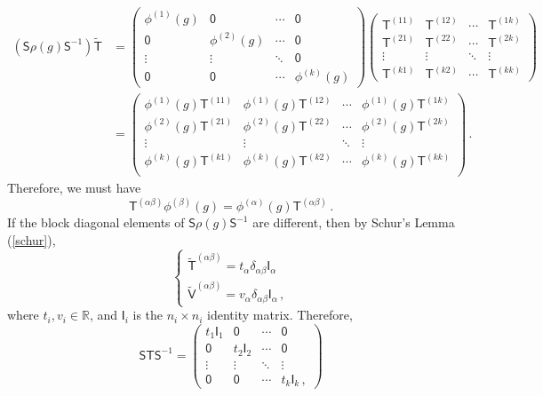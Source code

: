 \documentclass{article}
\theoremstyle{plain}\theoremheaderfont{\normalfont\itshape}\theorembodyfont{\rmfamily}\theoremseparator{.}\newtheorem*{rem}{Remark}\newtheorem*{ex}{Example}\newtheorem*{proof}{Proof}\newtheorem*{altp}{Alternative proof}
\theoremstyle{plain}\theoremheaderfont{\normalfont\bfseries}\theorembodyfont{\rmfamily}\theoremseparator{.}\newtheorem{thm}{Theorem}[section]\newtheorem{lem}[thm]{Lemma}\newtheorem{prop}[thm]{Proposition}\newtheorem*{cor}{Corollary}\newtheorem{defn}[thm]{Definition}\newtheorem{clm}[thm]{Claim}\newtheorem{clminproof}{Claim}
\theoremstyle{break}\theoremheaderfont{\normalfont\itshape}\theorembodyfont{\rmfamily}\theoremseparator{.\medskip}\newtheorem*{proofskip}{Proof}\newtheorem*{exs}{Examples}\newtheorem*{rems}{Remarks}
\theoremstyle{break}\theoremheaderfont{\normalfont\bfseries}\theorembodyfont{\rmfamily}\theoremseparator{.\medskip}\newtheorem{lemskip}[thm]{Lemma}\newtheorem{defnskip}[thm]{Definition}\newtheorem{propskip}[thm]{Proposition}\newtheorem{thmskip}[thm]{Theorem}
\numberwithin{equation}{section}
\begin{document}
	\begin{align*}
		(\mathsf{S}\rho(g)\mathsf{S}^{-1})\tilde{\mathsf{T}}&=\begin{pmatrix}
			\phi^{(1)}(g) & \mathsf{0} & \cdots & \mathsf{0}\\
			\mathsf{0} & \phi^{(2)}(g) & \cdots & \mathsf{0}\\
			\vdots & \vdots & \ddots & \mathsf{0}\\
			\mathsf{0} & \mathsf{0} & \cdots & \phi^{(k)}(g)
		\end{pmatrix}\begin{pmatrix}
			\mathsf{T}^{(11)} & \mathsf{T}^{(12)} & \cdots & \mathsf{T}^{(1k)}\\
			\mathsf{T}^{(21)} & \mathsf{T}^{(22)} & \cdots & \mathsf{T}^{(2k)}\\
			\vdots & \vdots & \ddots & \vdots\\
			\mathsf{T}^{(k1)} & \mathsf{T}^{(k2)} & \cdots & \mathsf{T}^{(kk)}
		\end{pmatrix}\\
		&=\begin{pmatrix}
			\phi^{(1)}(g)\mathsf{T}^{(11)} & \phi^{(1)}(g)\mathsf{T}^{(12)} & \cdots & \phi^{(1)}(g)\mathsf{T}^{(1k)}\\
			\phi^{(2)}(g)\mathsf{T}^{(21)} & \phi^{(2)}(g)\mathsf{T}^{(22)} & \cdots & \phi^{(2)}(g)\mathsf{T}^{(2k)}\\
			\vdots & \vdots & \ddots & \vdots\\
			\phi^{(k)}(g)\mathsf{T}^{(k1)} & \phi^{(k)}(g)\mathsf{T}^{(k2)} & \cdots & \phi^{(k)}(g)\mathsf{T}^{(kk)}\\
		\end{pmatrix}\,.
	\end{align*}
	Therefore, we must have
	\[\mathsf{T}^{(\alpha\beta)}\phi^{(\beta)}(g)=\phi^{(\alpha)}(g)\mathsf{T}^{(\alpha\beta)}\,.\]
	If the block diagonal elements of \(\mathsf{S}\rho(g)\mathsf{S}^{-1}\) are different, then by Schur's Lemma (\cref{schur}),
	\[\begin{cases}
		\tilde{\mathsf{T}}^{(\alpha\beta)}=t_\alpha\delta_{\alpha\beta}\mathsf{I}_\alpha\\
		\tilde{\mathsf{V}}^{(\alpha\beta)}=v_\alpha\delta_{\alpha\beta}\mathsf{I}_\alpha\,,
	\end{cases}\]
	where \(t_i,v_i\in\mathbb{R}\), and \(\mathsf{I}_i\) is the \(n_i\times n_i\) identity matrix.
	Therefore,
	\[\mathsf{STS}^{-1}=\begin{pmatrix}
		t_1\mathsf{I}_1 & \mathsf{0} & \cdots & \mathsf{0}\\
		\mathsf{0} & t_2\mathsf{I}_2 & \cdots & \mathsf{0}\\
		\vdots & \vdots & \ddots & \vdots\\
		\mathsf{0} & \mathsf{0} & \cdots & t_k\mathsf{I}_k\,,
	\end{pmatrix}\]
\end{document}
